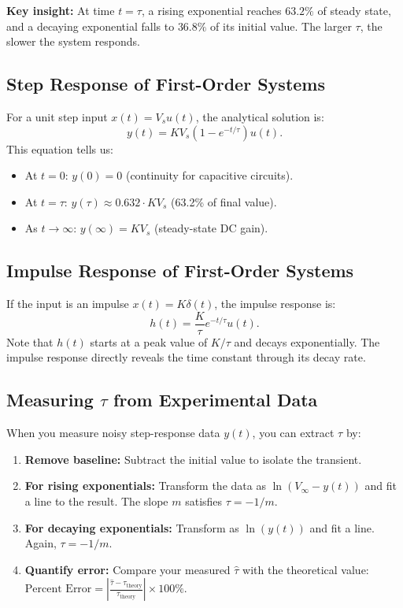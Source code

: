 \documentclass[11pt,letterpaper]{article}
\begin{document}
\noindent
\textbf{Key insight:} At time $t = \tau$, a rising exponential reaches $63.2\%$ of steady state, and a decaying exponential falls to $36.8\%$ of its initial value. The larger $\tau$, the slower the system responds.

\subsection{Step Response of First-Order Systems}

For a unit step input $x(t) = V_s u(t)$, the analytical solution is:
\begin{equation}
y(t) = K V_s \left(1 - e^{-t/\tau}\right) u(t).
\label{eq:step_response}
\end{equation}
This equation tells us:
\begin{itemize}
    \item At $t=0$: $y(0) = 0$ (continuity for capacitive circuits).
    \item At $t=\tau$: $y(\tau) \approx 0.632 \cdot K V_s$ (63.2\% of final value).
    \item As $t \to \infty$: $y(\infty) = K V_s$ (steady-state DC gain).
\end{itemize}

\subsection{Impulse Response of First-Order Systems}

If the input is an impulse $x(t) = K \delta(t)$, the impulse response is:
\begin{equation}
h(t) = \frac{K}{\tau} e^{-t/\tau} u(t).
\label{eq:impulse_response}
\end{equation}
Note that $h(t)$ starts at a peak value of $K/\tau$ and decays exponentially. The impulse response directly reveals the time constant through its decay rate.

\subsection{Measuring $\tau$ from Experimental Data}

When you measure noisy step-response data $y(t)$, you can extract $\tau$ by:

\begin{enumerate}
    \item \textbf{Remove baseline:} Subtract the initial value to isolate the transient.
    \item \textbf{For rising exponentials:} Transform the data as $\ln(V_\infty - y(t))$ and fit a line to the result. The slope $m$ satisfies $\tau = -1/m$.
    \item \textbf{For decaying exponentials:} Transform as $\ln(y(t))$ and fit a line. Again, $\tau = -1/m$.
    \item \textbf{Quantify error:} Compare your measured $\hat{\tau}$ with the theoretical value: $\text{Percent Error} = \left|\frac{\hat{\tau} - \tau_{\text{theory}}}{\tau_{\text{theory}}}\right| \times 100\%$.
\end{enumerate}
\end{document}
